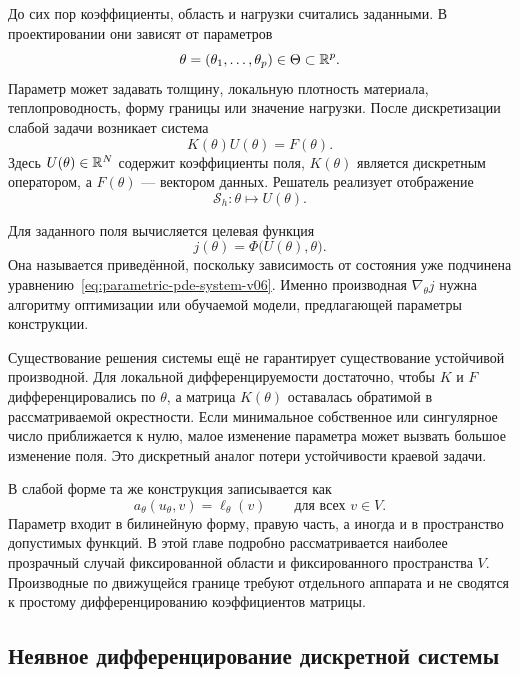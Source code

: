 До сих пор коэффициенты, область и нагрузки считались заданными. В проектировании они зависят от параметров
\[
 \theta=(\theta_1,\ldots,\theta_p)\in\Theta\subset\mathbb{R}^p.
\]
Параметр может задавать толщину, локальную плотность материала, теплопроводность, форму границы или значение нагрузки. После дискретизации слабой задачи возникает система
\begin{equation}
\label{eq:parametric-pde-system-v06}
 K(\theta)U(\theta)=F(\theta).
\end{equation}
Здесь $U(\theta)\in\mathbb{R}^N$ содержит коэффициенты поля, $K(\theta)$ является дискретным оператором, а $F(\theta)$ --- вектором данных. Решатель реализует отображение
\begin{equation}
\label{eq:pde-solution-map-v06}
 \mathcal S_h:\theta\longmapsto U(\theta).
\end{equation}

Для заданного поля вычисляется целевая функция
\begin{equation}
\label{eq:reduced-objective-v06}
 j(\theta)
 =
 \Phi\bigl(U(\theta),\theta\bigr).
\end{equation}
Она называется приведённой, поскольку зависимость от состояния уже подчинена уравнению~\eqref{eq:parametric-pde-system-v06}. Именно производная $\nabla_\theta j$ нужна алгоритму оптимизации или обучаемой модели, предлагающей параметры конструкции.

Существование решения системы ещё не гарантирует существование устойчивой производной. Для локальной дифференцируемости достаточно, чтобы $K$ и $F$ дифференцировались по $\theta$, а матрица $K(\theta)$ оставалась обратимой в рассматриваемой окрестности. Если минимальное собственное или сингулярное число приближается к нулю, малое изменение параметра может вызвать большое изменение поля. Это дискретный аналог потери устойчивости краевой задачи.

В слабой форме та же конструкция записывается как
\begin{equation}
\label{eq:parametric-weak-problem-v06}
 a_\theta(u_\theta,v)
 =
 \ell_\theta(v)
 \qquad
 \text{для всех }v\in V.
\end{equation}
Параметр входит в билинейную форму, правую часть, а иногда и в пространство допустимых функций. В этой главе подробно рассматривается наиболее прозрачный случай фиксированной области и фиксированного пространства $V$. Производные по движущейся границе требуют отдельного аппарата и не сводятся к простому дифференцированию коэффициентов матрицы.

\subsection{Неявное дифференцирование дискретной системы}

